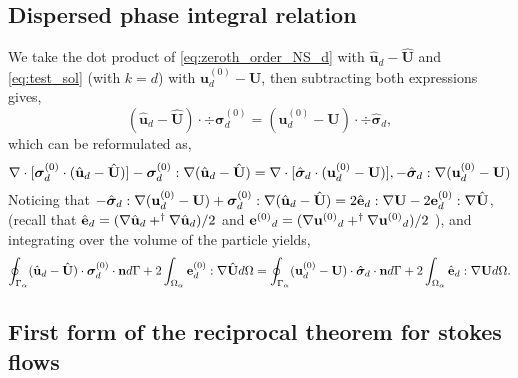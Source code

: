 \subsection{Dispersed phase integral relation}

We take the dot product of \ref{eq:zeroth_order_NS_d} with $\hat{\textbf{u}}_d - \hat{\textbf{U}}$ and \ref{eq:test_sol} (with $k=d$) with $\textbf{u}_d^{(0)} -\textbf{U}$, then subtracting both expressions gives, 
\begin{equation*}
    (\hat{\textbf{u}}_d - \hat{\textbf{U}})\cdot \div\bm\sigma_d^{(0)}
    =
    (\textbf{u}_d^{(0)} - \textbf{U}) \cdot \div \hat{\bm\sigma}_d, 
\end{equation*}
which can be reformulated as, 
\begin{equation*}
    \mathbf{\nabla}\cdot [\bm\sigma_d^{(0)} \cdot (\hat{\textbf{u}}_d - \hat{\textbf{U}})]
    - \bm\sigma_d^{(0)} : \mathbf{\nabla} (\hat{\textbf{u}}_d - \hat{\textbf{U}})
    =
    \mathbf{\nabla}\cdot [\hat{\bm\sigma}_d \cdot (\textbf{u}_d^{(0)} - \textbf{U})], 
    - \hat{\bm\sigma}_d : \mathbf{\nabla} ({\textbf{u}}_d^{(0)} - \textbf{U})
\end{equation*}
Noticing that $- \hat{\bm\sigma}_d : \mathbf{\nabla} ({\textbf{u}}_d^{(0)} - \textbf{U}) + \bm\sigma_d^{(0)} : \mathbf{\nabla} (\hat{\textbf{u}}_d - \hat{\textbf{U}}) = 2 \hat{\textbf{e}}_d : \mathbf{\nabla} \textbf{U} - 2 \textbf{e}_d^{(0)} : \mathbf{\nabla} \hat{\textbf{U}}$, 
(recall that $\hat{\textbf{e}}_d = (\mathbf{\nabla} \hat{\textbf{u}}_d + ^\dagger \mathbf{\nabla} \hat{\textbf{u}}_d)/2$ and ${\textbf{e}^{(0)}}_d = (\mathbf{\nabla} {\textbf{u}^{(0)}}_d + ^\dagger \mathbf{\nabla} {\textbf{u}^{(0)}}_d)/2$ ), and integrating over the volume of the particle yields, 
\begin{equation}
    \intS{(\hat{\textbf{u}}_d - \hat{\textbf{U}})\cdot \bm\sigma_d^{(0)} \cdot \textbf{n}}
    + 2\intO{\textbf{e}_d^{(0)} : \grad \hat{\textbf{U}}}
    =
    \intS{(\textbf{u}_d^{(0)} - \textbf{U}) \cdot  \hat{\bm\sigma}_d\cdot \textbf{n} }
    + 2\intO{\hat{\textbf{e}}_d : \grad \textbf{U}}. 
    \label{eq:reciprocal_d}
\end{equation}



\subsection{First form of the reciprocal theorem for stokes flows}

